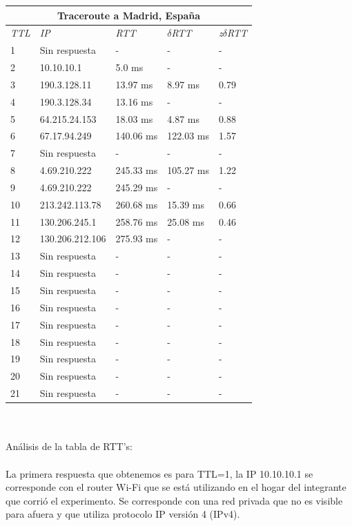 \begin{tabular}{ |p{2cm}||p{3cm}|p{3cm}|p{3cm}|p{3cm}|   }
 \hline
 \multicolumn{5}{|c|}{Traceroute a Madrid, España} \\
 \hline
 \textit{TTL} & \textit{IP}  & \textit{RTT} & $\delta$\textit{RTT} & \textit{z}$\delta$\textit{RTT}\\
 \hline
 1   & Sin respuesta  & - &   - & -\\
 2   & 10.10.10.1 & 5.0 ms &   - & -\\
 3   & 190.3.128.11  & 13.97 ms & 8.97 ms & 0.79  \\
 4   & 190.3.128.34   & 13.16 ms &   - & -\\	
 5   & 64.215.24.153  & 18.03 ms &  4.87 ms & 0.88\\
 6   &  67.17.94.249 & 140.06 ms &  122.03 ms & 1.57\\
 7   & Sin respuesta  & - &  - & -\\
 8   & 4.69.210.222  & 245.33 ms & 105.27 ms &  1.22\\
 9   & 4.69.210.222 & 245.29 ms &  - & -\\
 10   & 213.242.113.78   & 260.68 ms & 15.39 ms & 0.66\\
 11   & 130.206.245.1   & 258.76 ms & 25.08 ms & 0.46\\
 12   & 130.206.212.106  & 275.93 ms &  - & -\\
 13   & Sin respuesta  & - & - & -\\
 14   & Sin respuesta  & - & - & -\\
 15   & Sin respuesta  & - & - & -\\
 16   & Sin respuesta  & - & - & -\\
 17   & Sin respuesta  & - & - & -\\
 18   & Sin respuesta  & - & - & -\\
 19   & Sin respuesta  & - & - & -\\
 20   & Sin respuesta  & - & - & -\\
 21   & Sin respuesta  & - & - & -\\
 \hline
\end{tabular} \\ \\


Análisis de la tabla de RTT's: \\ \\

La primera respuesta que obtenemos es para TTL=1, la IP 10.10.10.1 se corresponde con el router Wi-Fi que se está utilizando en el hogar del 
integrante que corrió el experimento. Se corresponde con una red privada que no es visible para afuera y que utiliza protocolo IP versión 4 (IPv4). \\ \\

